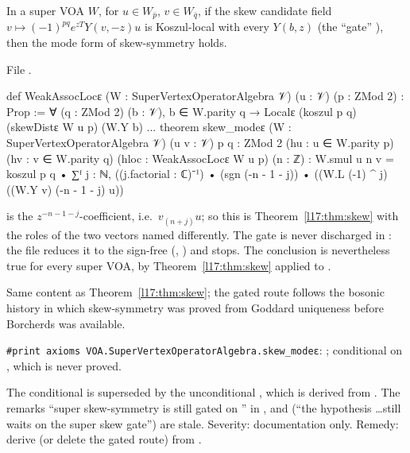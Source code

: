 \begin{proposition}\label{l17:prop:skewgated}
In a super VOA $W$, for $u\in W_{\bar p}$, $v\in W_{\bar q}$, if the skew candidate field
$v\mapsto(-1)^{pq}e^{zT}Y(v,-z)u$ is Koszul-local with every $Y(b,z)$ (the ``gate''
), then the mode form of skew-symmetry holds.
\end{proposition}
\noindent File .
\begin{leancode}
def WeakAssocLocε (W : SuperVertexOperatorAlgebra 𝒱) (u : 𝒱) (p : ZMod 2) : Prop :=
  ∀ (q : ZMod 2) (b : 𝒱), b ∈ W.parity q → Localε (koszul p q) (skewDistε W u p) (W.Y b)
...
theorem skew_modeε (W : SuperVertexOperatorAlgebra 𝒱) (u v : 𝒱) {p q : ZMod 2}
    (hu : u ∈ W.parity p) (hv : v ∈ W.parity q) (hloc : WeakAssocLocε W u p) (n : ℤ) :
    W.smul u n v
      = koszul p q • ∑ᶠ j : ℕ, ((j.factorial : ℂ)⁻¹) • (sgn (-n - 1 - j)) •
          ((W.L (-1) ^ j) ((W.Y v) (-n - 1 - j) u))
\end{leancode}
\begin{dictionary}
 is the $z^{-n-1-j}$-coefficient, i.e.\ $v_{(n+j)}u$; so this is
Theorem~\ref{l17:thm:skew} with the roles of the two vectors named differently. The gate
 is never discharged in : the file reduces it to the sign-free
 (,
) and stops. The conclusion is nevertheless true for every super VOA,
by Theorem~\ref{l17:thm:skew} applied to .
\end{dictionary}
\begin{physics}
Same content as Theorem~\ref{l17:thm:skew}; the gated route follows the bosonic history in which
skew-symmetry was proved from Goddard uniqueness before Borcherds was available.
\end{physics}
\begin{status}
\texttt{\#print axioms VOA.SuperVertexOperatorAlgebra.skew\_modeε}: ; conditional on , which is never
proved.
\end{status}

\begin{warning}[title={Finding (F5): a superseded gate and stale documentation}]
The conditional  is superseded by the unconditional ,
which is derived from . The remarks ``super skew-symmetry is still gated on
'' in ,
 and  (``the  hypothesis \dots still waits on the super skew gate'')
are stale. Severity: documentation only. Remedy: derive  (or delete the gated route) from
.
\end{warning}

